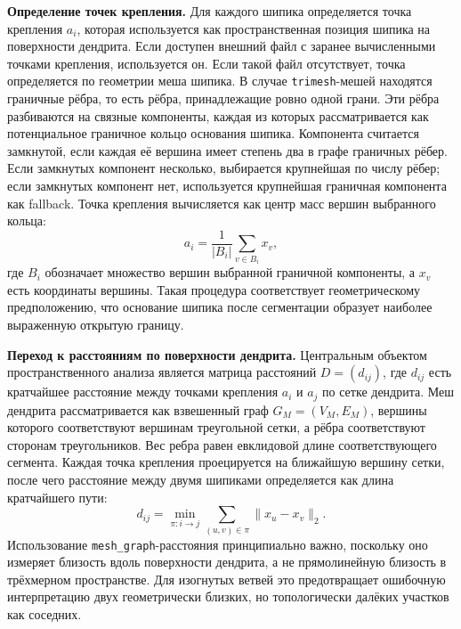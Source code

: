 \documentclass[12pt,a4paper]{article}
\begin{document}
\noindent\textbf{Определение точек крепления.}
Для каждого шипика определяется точка крепления \(a_i\), которая используется как пространственная позиция шипика на поверхности дендрита. Если доступен внешний файл с заранее вычисленными точками крепления, используется он. Если такой файл отсутствует, точка определяется по геометрии меша шипика. В случае \texttt{trimesh}-мешей находятся граничные рёбра, то есть рёбра, принадлежащие ровно одной грани. Эти рёбра разбиваются на связные компоненты, каждая из которых рассматривается как потенциальное граничное кольцо основания шипика. Компонента считается замкнутой, если каждая её вершина имеет степень два в графе граничных рёбер. Если замкнутых компонент несколько, выбирается крупнейшая по числу рёбер; если замкнутых компонент нет, используется крупнейшая граничная компонента как fallback. Точка крепления вычисляется как центр масс вершин выбранного кольца:
\[
a_i=\frac{1}{|B_i|}\sum_{v\in B_i}x_v,
\]
где \(B_i\) обозначает множество вершин выбранной граничной компоненты, а \(x_v\) есть координаты вершины. Такая процедура соответствует геометрическому предположению, что основание шипика после сегментации образует наиболее выраженную открытую границу.

\noindent\textbf{Переход к расстояниям по поверхности дендрита.}
Центральным объектом пространственного анализа является матрица расстояний \(D=(d_{ij})\), где \(d_{ij}\) есть кратчайшее расстояние между точками крепления \(a_i\) и \(a_j\) по сетке дендрита. Меш дендрита рассматривается как взвешенный граф \(G_M=(V_M,E_M)\), вершины которого соответствуют вершинам треугольной сетки, а рёбра соответствуют сторонам треугольников. Вес ребра равен евклидовой длине соответствующего сегмента. Каждая точка крепления проецируется на ближайшую вершину сетки, после чего расстояние между двумя шипиками определяется как длина кратчайшего пути:
\[
d_{ij}=\min_{\pi:i\rightarrow j}\sum_{(u,v)\in\pi}\|x_u-x_v\|_2.
\]
Использование \texttt{mesh\_graph}-расстояния принципиально важно, поскольку оно измеряет близость вдоль поверхности дендрита, а не прямолинейную близость в трёхмерном пространстве. Для изогнутых ветвей это предотвращает ошибочную интерпретацию двух геометрически близких, но топологически далёких участков как соседних.
\end{document}
